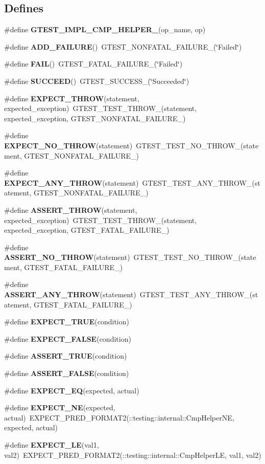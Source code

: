 \subsection*{Defines}
\begin{CompactItemize}
\item 
\#define {\bf GTEST\_\-IMPL\_\-CMP\_\-HELPER\_\-}(op\_\-name, op)
\item 
\#define {\bf ADD\_\-FAILURE}()~GTEST\_\-NONFATAL\_\-FAILURE\_\-(\char`\"{}Failed\char`\"{})
\item 
\#define {\bf FAIL}()~GTEST\_\-FATAL\_\-FAILURE\_\-(\char`\"{}Failed\char`\"{})
\item 
\#define {\bf SUCCEED}()~GTEST\_\-SUCCESS\_\-(\char`\"{}Succeeded\char`\"{})
\item 
\#define {\bf EXPECT\_\-THROW}(statement, expected\_\-exception)~GTEST\_\-TEST\_\-THROW\_\-(statement, expected\_\-exception, GTEST\_\-NONFATAL\_\-FAILURE\_\-)
\item 
\#define {\bf EXPECT\_\-NO\_\-THROW}(statement)~GTEST\_\-TEST\_\-NO\_\-THROW\_\-(statement, GTEST\_\-NONFATAL\_\-FAILURE\_\-)
\item 
\#define {\bf EXPECT\_\-ANY\_\-THROW}(statement)~GTEST\_\-TEST\_\-ANY\_\-THROW\_\-(statement, GTEST\_\-NONFATAL\_\-FAILURE\_\-)
\item 
\#define {\bf ASSERT\_\-THROW}(statement, expected\_\-exception)~GTEST\_\-TEST\_\-THROW\_\-(statement, expected\_\-exception, GTEST\_\-FATAL\_\-FAILURE\_\-)
\item 
\#define {\bf ASSERT\_\-NO\_\-THROW}(statement)~GTEST\_\-TEST\_\-NO\_\-THROW\_\-(statement, GTEST\_\-FATAL\_\-FAILURE\_\-)
\item 
\#define {\bf ASSERT\_\-ANY\_\-THROW}(statement)~GTEST\_\-TEST\_\-ANY\_\-THROW\_\-(statement, GTEST\_\-FATAL\_\-FAILURE\_\-)
\item 
\#define {\bf EXPECT\_\-TRUE}(condition)
\item 
\#define {\bf EXPECT\_\-FALSE}(condition)
\item 
\#define {\bf ASSERT\_\-TRUE}(condition)
\item 
\#define {\bf ASSERT\_\-FALSE}(condition)
\item 
\#define {\bf EXPECT\_\-EQ}(expected, actual)
\item 
\#define {\bf EXPECT\_\-NE}(expected, actual)~EXPECT\_\-PRED\_\-FORMAT2(::testing::internal::CmpHelperNE, expected, actual)
\item 
\#define {\bf EXPECT\_\-LE}(val1, val2)~EXPECT\_\-PRED\_\-FORMAT2(::testing::internal::CmpHelperLE, val1, val2)

\end{CompactItemize}
